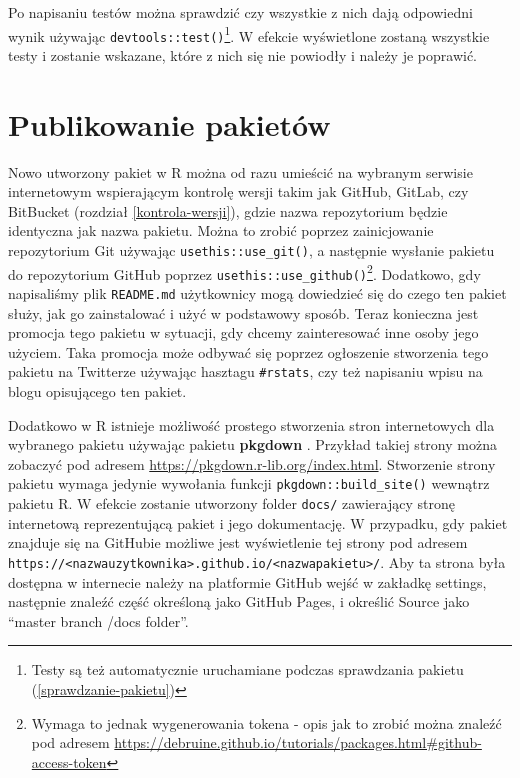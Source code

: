 \documentclass[paper=6in:9in,pagesize=pdftex,headinclude=on,footinclude=on,10pt]{scrbook}
\begin{document}
Po napisaniu testów można sprawdzić czy wszystkie z nich dają odpowiedni wynik używając \texttt{devtools::test()}\footnote{Testy są też automatycznie uruchamiane podczas sprawdzania pakietu (\ref{sprawdzanie-pakietu})}.
W efekcie wyświetlone zostaną wszystkie testy i zostanie wskazane, które z nich się nie powiodły i należy je poprawić.

\hypertarget{publikowanie-pakietuxf3w}{%
\section{Publikowanie pakietów}\label{publikowanie-pakietuxf3w}}

Nowo utworzony pakiet w R można od razu umieścić na wybranym serwisie internetowym wspierającym kontrolę wersji takim jak GitHub, GitLab, czy BitBucket (rozdział \ref{kontrola-wersji}), gdzie nazwa repozytorium będzie identyczna jak nazwa pakietu.
Można to zrobić poprzez zainicjowanie repozytorium Git używając \texttt{usethis::use\_git()}, a następnie wysłanie pakietu do repozytorium GitHub poprzez \texttt{usethis::use\_github()}\footnote{Wymaga to jednak wygenerowania tokena - opis jak to zrobić można znaleźć pod adresem \url{https://debruine.github.io/tutorials/packages.html\#github-access-token}}.
Dodatkowo, gdy napisaliśmy plik \texttt{README.md} użytkownicy mogą dowiedzieć się do czego ten pakiet służy, jak go zainstalować i użyć w podstawowy sposób.
Teraz konieczna jest promocja tego pakietu w sytuacji, gdy chcemy zainteresować inne osoby jego użyciem.
Taka promocja może odbywać się poprzez ogłoszenie stworzenia tego pakietu na Twitterze używając hasztagu \texttt{\#rstats}, czy też napisaniu wpisu na blogu opisującego ten pakiet.

Dodatkowo w R istnieje możliwość prostego stworzenia stron internetowych dla wybranego pakietu używając pakietu \textbf{pkgdown} \citep{R-pkgdown}.
Przykład takiej strony można zobaczyć pod adresem \url{https://pkgdown.r-lib.org/index.html}.
Stworzenie strony pakietu wymaga jedynie wywołania funkcji \texttt{pkgdown::build\_site()} wewnątrz pakietu R.
W efekcie zostanie utworzony folder \texttt{docs/} zawierający stronę internetową reprezentującą pakiet i jego dokumentację.
W przypadku, gdy pakiet znajduje się na GitHubie możliwe jest wyświetlenie tej strony pod adresem \texttt{https://\textless{}nazwauzytkownika\textgreater{}.github.io/\textless{}nazwapakietu\textgreater{}/}.
Aby ta strona była dostępna w internecie należy na platformie GitHub wejść w zakładkę settings, następnie znaleźć część określoną jako GitHub Pages, i określić Source jako ``master branch /docs folder''.
\end{document}
